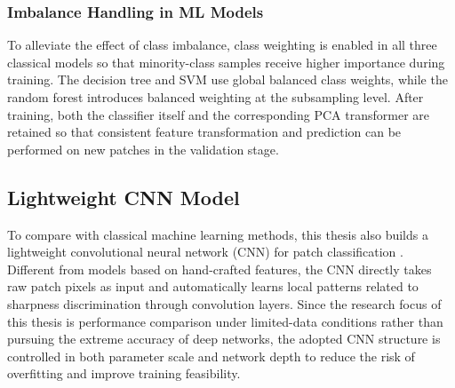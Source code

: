 \subsubsection{Imbalance Handling in ML Models}
\par To alleviate the effect of class imbalance, class weighting is enabled in
all three classical models so that minority-class samples receive higher
importance during training. The decision tree and SVM use global balanced class
weights, while the random forest introduces balanced weighting at the
subsampling level. After training, both the classifier itself and the
corresponding PCA transformer are retained so that consistent feature
transformation and prediction can be performed on new patches in the validation
stage.

\subsection{Lightweight CNN Model}
\par To compare with classical machine learning methods, this thesis also builds
a lightweight convolutional neural network (CNN) for patch classification
\cite{lecun2002gradient,krizhevsky2012imagenet}. Different from models based on
hand-crafted features, the CNN directly takes raw patch pixels as input and
automatically learns local patterns related to sharpness discrimination through
convolution layers. Since the research focus of this thesis is performance
comparison under limited-data conditions rather than pursuing the extreme
accuracy of deep networks, the adopted CNN structure is controlled in both
parameter scale and network depth to reduce the risk of overfitting and improve
training feasibility.

